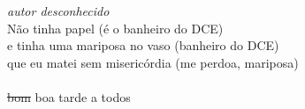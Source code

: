 
\vfill %

\emph{autor desconhecido}\\
Não tinha papel (é o banheiro do DCE)\\
e tinha uma mariposa no vaso (banheiro do DCE)\\
que eu matei sem misericórdia (me perdoa, mariposa)\\
\\
\sout{bom} boa tarde a todos